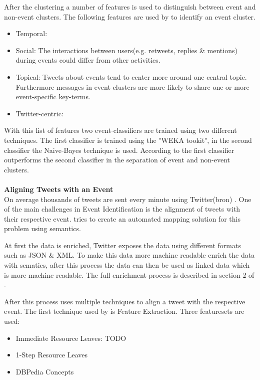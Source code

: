 \documentclass{article}
\begin{document}
After the clustering a number of features is used to distinguish between event and non-event clusters. The following features are used by \cite{eventident} to identify an event cluster. 
\begin{itemize}
  \item Temporal:
  \item Social: The interactions between users(e.g. retweets, replies \& mentions) during events could differ from other activities. 
  \item Topical: Tweets about events tend to center more around one central topic. Furthermore messages in event clusters are more likely to share one or more event-specific key-terms.  
  \item Twitter-centric: 
\end{itemize}
With this list of features two event-classifiers are trained using two different techniques. The first classifier is trained using the "WEKA tookit", in the second classifier the  Naive-Bayes technique is used. According to \cite{eventident} the first classifier outperforms the second classifier in the separation of event and non-event clusters. 
\\\\
\textbf{Aligning Tweets with an Event} \\
On average thousands of tweets are sent every minute using Twitter(bron) . One of the main challenges in Event Identification is the alignment of tweets with their respective event. \cite{eventalign} tries to create an automated mapping solution for this problem using semantics.

At first the data is enriched, Twitter exposes the data using different formats such as JSON \& XML. To make this data more machine readable \cite{eventalign} enrich the data with sematics, after this process the data can then  be used as linked data which is more machine readable. The full enrichment process is described in section 2 of \cite{eventalign}.

After this process \cite{eventalign} uses multiple techniques to align a tweet with the respective event. The first technique used by \cite{eventalign} is Feature Extraction. Three featuresets are used:
\begin{itemize}
  \item Immediate Resource Leaves: TODO
  \item 1-Step Resource Leaves 
  \item DBPedia Concepts 
\end{itemize}
\end{document}
